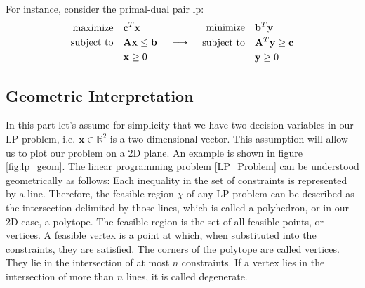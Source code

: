 For instance, consider the primal-dual pair \gls{lp}:
\[
    \begin{array}{c@{\quad}c@{\quad}c}
        \begin{aligned}
            \text{maximize} \quad   & \mathbf{c}^T \mathbf{x}               \\
            \text{subject to} \quad & \mathbf{A} \mathbf{x} \leq \mathbf{b} \\
                                    & \mathbf{x} \geq 0                     \\
        \end{aligned}
         &
        \begin{array}{c}
            \longrightarrow
        \end{array}
         &
        \begin{aligned}
            \text{minimize} \quad   & \mathbf{b}^T \mathbf{y}                 \\
            \text{subject to} \quad & \mathbf{A}^T \mathbf{y} \geq \mathbf{c} \\
                                    & \mathbf{y} \geq 0                       \\
        \end{aligned}
    \end{array}
\]

\subsection{Geometric Interpretation}
In this part let's assume for simplicity that we have two decision variables
in our LP problem, i.e. $\mathbf{x} \in \mathbb{R}^2 $
is a two dimensional vector. This assumption will allow us to plot our problem on
a 2D plane. An example is shown in figure \ref{fig:lp_geom}.
The linear programming problem \ref{LP_Problem} can be understood geometrically as follows:
Each inequality in the set of constraints is represented by a line.
Therefore, the feasible region $\chi$ of any LP problem can be described as the intersection delimited
 by those lines, which is called a polyhedron, or in our 2D case, a polytope.
 The feasible region is the set of all feasible points, or vertices.
 A feasible vertex is a point at which, when substituted into the constraints, they are satisfied.
 The corners of the polytope are called vertices.
They lie in the intersection of at most $n$ constraints. If a vertex lies in the 
intersection of more than $n$ lines, it is called degenerate.

